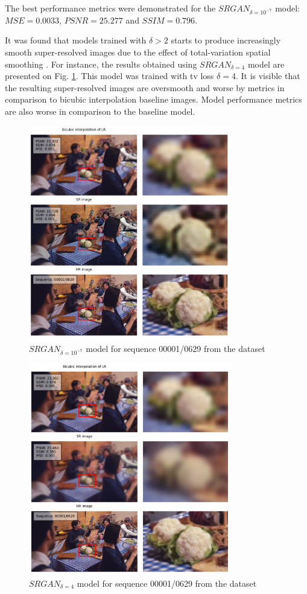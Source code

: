 \documentclass[conference]{IEEEtran}
\begin{document}
The best performance metrics were demonstrated for the $SRGAN_{\delta=10^{-7}}$ model: $MSE=0.0033$, $PSNR=25.277$ and $SSIM=0.796$.

It was found that models trained with $\delta > 2$ starts to produce increasingly smooth super-resolved images due to the effect of total-variation spatial smoothing \cite{image_upsampling_total_variation_regularization_2005}. For instance, the results obtained using $SRGAN_{\delta=4}$ model are presented on Fig. \ref{fig:tv_1e_7_seq_00001_0629}. This model was trained with \acrshort{tv} loss $\delta=4$. It is visible that the resulting super-resolved images are oversmooth and worse by metrics in comparison to bicubic interpolation baseline images. Model performance metrics are also worse in comparison to the baseline model.

\begin{figure}[htb]
	\centering
    \centerline{\includegraphics[width=8.9cm]{results/00001_0629}}
	\caption{$SRGAN_{\delta=10^{-7}}$ model for sequence 00001/0629 from the dataset \cite{vimeo90k_2019}}
	\label{fig:tv_1e_7_seq_00001_0629}
\end{figure}

\begin{figure}[htb]
	\centering
    \centerline{\includegraphics[width=8.9cm]{results/tv_4_00001_0629}}
	\caption{$SRGAN_{\delta=4}$ model for sequence 00001/0629 from the dataset \cite{vimeo90k_2019}}
	\label{fig:tv_4_seq_00001_0629}
\end{figure}
\end{document}
